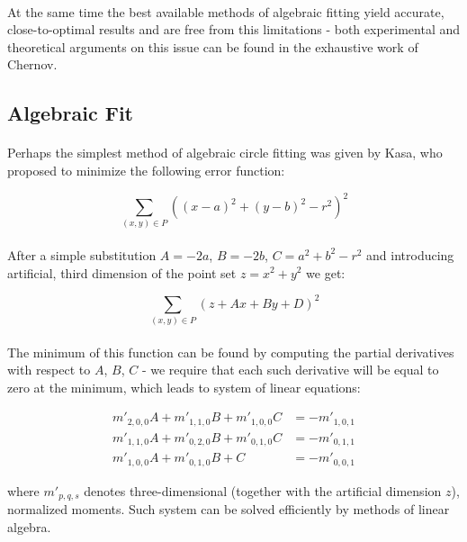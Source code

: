 \paragraph*{}
At the same time the best available methods of algebraic fitting yield accurate, close-to-optimal results and are free from this limitations - both experimental and theoretical arguments on this issue can be found in the exhaustive work\cite{Chernov10} of Chernov.

\subsection{Algebraic Fit}

\paragraph*{}
Perhaps the simplest method of algebraic circle fitting was given by Kasa, who proposed to minimize the following error function:

\[
	\sum_{(x,y) \in P} ((x-a)^2 + (y-b)^2 - r^2)^2
\]

\paragraph*{}
After a simple substitution $A = -2a$, $B = -2b$, $C = a^2 + b^2 - r^2$ and introducing artificial, third dimension of the point set $z = x^2 + y^2$ we get:

\[
	\sum_{(x,y) \in P} (z + Ax + By + D)^2
\]

\paragraph*{}
The minimum of this function can be found by computing the partial derivatives with respect to $A$, $B$, $C$ - we require that each such derivative will be equal to zero at the minimum, which leads to system of linear equations:

\begin{align*}
	m'_{2,0,0}A + m'_{1,1,0}B + m'_{1,0,0}C &= -m'_{1,0,1}\\
	m'_{1,1,0}A + m'_{0,2,0}B + m'_{0,1,0}C &= -m'_{0,1,1}\\
	m'_{1,0,0}A + m'_{0,1,0}B + C &= -m'_{0,0,1}
\end{align*}

where $m'_{p,q,s}$ denotes three-dimensional (together with the artificial dimension $z$), normalized moments. Such system can be solved efficiently by methods of linear algebra.

